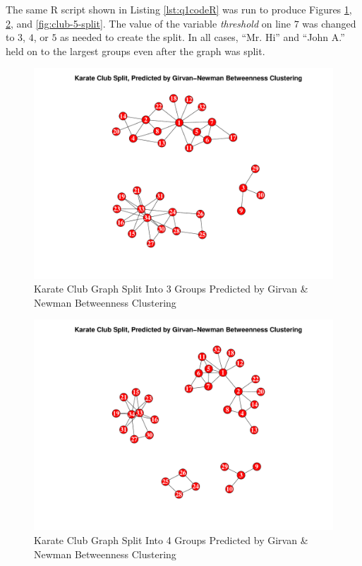 \documentclass[letterpaper,11pt]{article}
\begin{document}
The same R script shown in Listing \ref{lst:q1codeR} was run to produce Figures \ref{fig:club-3-split}, \ref{fig:club-4-split}, and \ref{fig:club-5-split}.  The value of the variable \emph{threshold} on line $7$ was changed to $3$, $4$, or $5$ as needed to create the split.  In all cases, ``Mr. Hi'' and ``John A.'' held on to the largest groups even after the graph was split.

\begin{figure}[h]
\includegraphics[scale=0.5]{group-of-3.pdf}
\caption{Karate Club Graph Split Into 3 Groups Predicted by Girvan \& Newman Betweenness Clustering}
\label{fig:club-3-split}
\end{figure}

\begin{figure}[h]
\includegraphics[scale=0.5]{group-of-4.pdf}
\caption{Karate Club Graph Split Into 4 Groups Predicted by Girvan \& Newman Betweenness Clustering}
\label{fig:club-4-split}
\end{figure}
\end{document}
